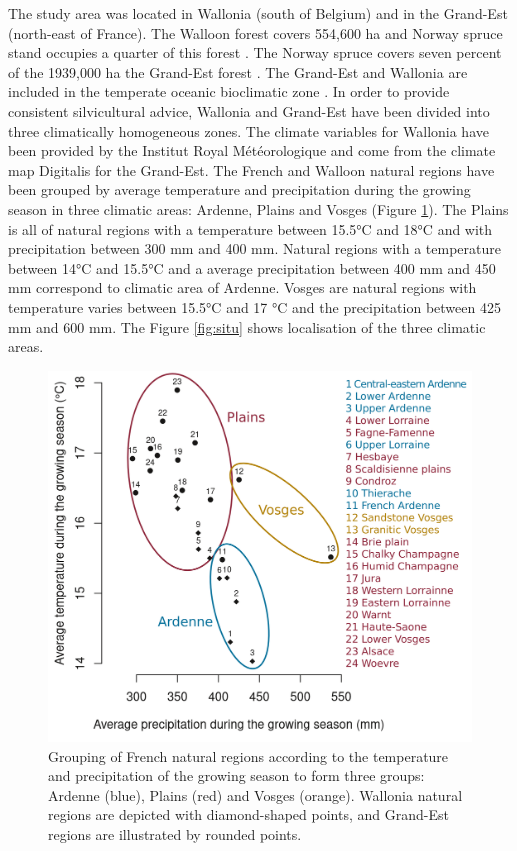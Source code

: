 \documentclass[3p,procedia]{elsarticle}
\begin{document}
The study area was located in Wallonia (south of Belgium) and in the Grand-Est (north-east of France).
The Walloon forest covers 554,600 ha and  Norway spruce stand occupies a quarter of this forest \citep{Alderweireld_2015}. 
The Norway spruce covers seven percent of the 1939,000 ha the Grand-Est forest \citep{IGN2022}. 
The Grand-Est and Wallonia are included in the temperate oceanic bioclimatic zone \citep{lindner_climate_2010}.
In order to provide consistent silvicultural advice, Wallonia and Grand-Est have been divided into three climatically homogeneous zones.
The climate variables for Wallonia have been provided by the Institut Royal Météorologique and come from the climate map Digitalis \citep{piedallu_presentation_2014} for the Grand-Est.
The French and Walloon natural regions have been grouped by average temperature and precipitation during the growing season in three climatic areas: Ardenne, Plains and Vosges (Figure \ref{fig:clim}).
The Plains is all of natural regions with a temperature between 15.5°C and 18°C and with precipitation between 300 mm and 400 mm.
Natural regions with a temperature between 14°C and 15.5°C and a average precipitation between 400 mm and 450 mm correspond to climatic area of Ardenne.
Vosges are natural regions with temperature varies between 15.5°C and 17 °C and the precipitation between 425 mm and 600 mm.
The Figure \ref{fig:situ} shows localisation of the three climatic areas. 

\begin{figure}[htbp] 
	\centering
	\includegraphics[width=0.8\linewidth]{climat/climat_region.png}
	\caption{Grouping of French natural regions according to the temperature and precipitation of the growing season to form three groups: Ardenne (blue), Plains (red) and Vosges (orange). Wallonia natural regions are depicted with diamond-shaped points, and Grand-Est regions are illustrated by rounded points.}
	\label{fig:clim}
\end{figure}
\end{document}
